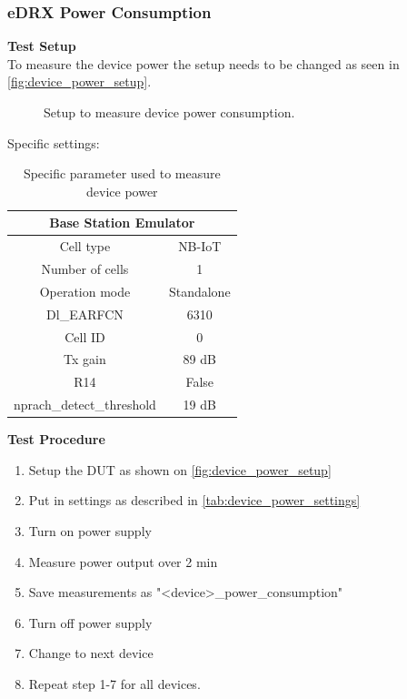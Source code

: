 \subsubsection{\gls{eDRX} Power Consumption}
\textbf{Test Setup}\\
To measure the device power the setup needs to be changed as seen in \autoref{fig:device_power_setup}.
\begin{figure}[H]
\centering
{}
\caption{Setup to measure device power consumption.}
\label{fig:device_power_setup}
\end{figure}

Specific settings:
\begin{table}[H]
\centering
\begin{tabular}{|c|c|} \hline
\multicolumn{2}{|c|}{\textbf{Base Station Emulator}} \\ \hline
Cell type          & NB-IoT         \\ \hline
Number of cells    & 1              \\ \hline
Operation mode     & Standalone     \\ \hline
Dl\_EARFCN         & 6310           \\ \hline
Cell ID            & 0              \\ \hline
Tx gain            & 89 dB          \\ \hline
R14                & False          \\ \hline
nprach\_detect\_threshold  & 19 dB  \\ \hline
\end{tabular}
\caption{Specific parameter used to measure device power}
\label{tab:device_power_settings}
\end{table}


\textbf{Test Procedure}\\
\begin{enumerate}
\item Setup the \gls{DUT} as shown on \autoref{fig:device_power_setup}
\item Put in settings as described in \autoref{tab:device_power_settings} 
\item Turn on power supply 
\item Measure power output over 2 min
\item Save measurements as "<device>\_power\_consumption"
\item Turn off power supply
\item Change to next device
\item Repeat step 1-7 for all devices.
\end{enumerate}

